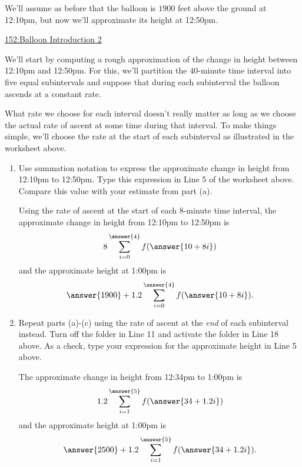 \documentclass{ximera}
\begin{document}
\begin{example} \label{ExLKDrDEfRE9}

We'll assume as before that the balloon is $1900$ feet above the ground at 12:10pm, but now we'll approximate its height at 12:50pm.

\begin{onlineOnly}
    \begin{center}
\end{center}
\end{onlineOnly}

\href{https://www.desmos.com/calculator/h6cworakdw}{152:Balloon Introduction 2}

We'll start by computing a rough approximation of the change in height between 12:10pm and 12:50pm. For this, we'll partition the $40$-minute time interval into five equal subintervals and suppose that during each subinterval the balloon ascends at a constant rate. 

What rate we choose for each interval doesn't really matter as long as we choose the actual rate of ascent at some time during that interval. To make things simple, we'll choose the rate at the start of each subinterval as illustrated in the worksheet above. 

\begin{enumerate}

\item Use summation notation to express the approximate change in height from 12:10pm to 12:50pm. Type this expression in Line 5 of the worksheet above. Compare this value with your estimate from part (a).

Using the rate of ascent at the start of each $8$-minute time interval, the approximate change in height from 12:10pm to 12:50pm is
\[
  8 \sum_{i=0}^{\answer{4}} f(\answer{10 + 8i})  
\]
and the approximate height at 1:00pm is
\[
     \answer{1900} + 1.2 \sum_{i=0}^{\answer{4}} f(\answer{10 + 8i})  .
\]

\item Repeat parts (a)-(c) using the rate of ascent at the \emph{end} of each subinterval instead. Turn off the folder in Line 11 and activate the folder in Line 18 above. As a check, type your expression for the approximate height in Line 5 above.

The approximate change in height from 12:34pm to 1:00pm is
\[
  1.2 \sum_{i=1}^{\answer{5}} f(\answer{34 + 1.2i})  
\]
and the approximate height at 1:00pm is
\[
     \answer{2500} + 1.2 \sum_{i=1}^{\answer{5}} f(\answer{34 + 1.2i})  .
\]


\end{enumerate}
\end{example}
\end{document}

